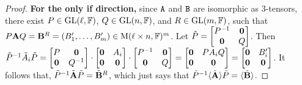 \documentclass[11pt]{article}
\begin{document}
\begin{proof}
\textbf{For the only if direction,} since $\mathtt{A}$ and $\mathtt{B}$ are isomorphic as 3-tensors, 
there exist $P\in \mathrm{GL}(\ell, \mathbb{F})$, $Q\in\mathrm{GL}(n, \mathbb{F})$, and 
$R\in\mathrm{GL}(m, \mathbb{F})$, such that $P\mathbf{A} Q=\mathbf{B}^R=(B_1', \dots, B_m')\in\mathrm{M}(\ell\times n, 
\mathbb{F})^m$. Let 
$\tilde P=\begin{bmatrix} 
P^{-1} & \mathbf{0} \\
\mathbf{0} & Q
\end{bmatrix}$. Then $\tilde P^{-1}\tilde A_i \tilde P=
\begin{bmatrix}
P & \mathbf{0} \\
\mathbf{0} & Q^{-1}
\end{bmatrix}\cdot 
\begin{bmatrix}
\mathbf{0} & A_i \\
\mathbf{0} & \mathbf{0} 
\end{bmatrix}\cdot 
\begin{bmatrix}
P^{-1} & \mathbf{0} \\
\mathbf{0} & Q
\end{bmatrix}
=
\begin{bmatrix}
\mathbf{0} & P A_i Q \\
\mathbf{0} & \mathbf{0} 
\end{bmatrix}
=
\begin{bmatrix}
\mathbf{0} & B_i'\\
\mathbf{0} & \mathbf{0}
\end{bmatrix}
$.
It follows that, $\tilde P^{-1}\tilde{\mathbf{A}} \tilde P=\tilde{\mathbf{B}}^R$, which just says that 
$\tilde P^{-1} \langle\tilde{\mathbf{A}}\rangle \tilde P =\langle\tilde{\mathbf{B}}\rangle$.


\end{proof}
\end{document}
